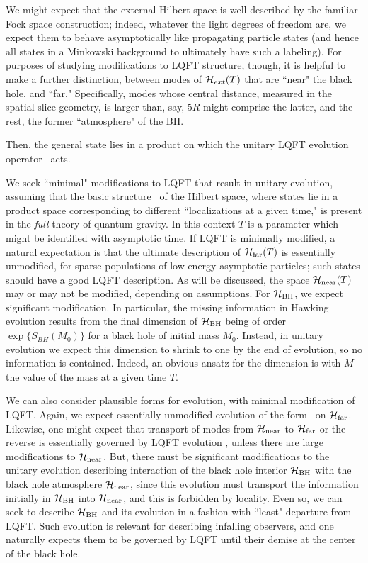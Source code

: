 We might expect that the external Hilbert space is well-described by the familiar Fock space construction; indeed, whatever the light degrees of freedom are, we expect them to behave asymptotically like propagating particle states (and hence all states in a Minkowski background to ultimately have such a labeling).
For purposes of studying modifications to LQFT structure, though, it is helpful to make a further distinction, between modes of ${\cal H}_{ext}(T)$ that are ``near" the black hole, and ``far,"  
%
\eqn{}
%
Specifically, modes whose central distance, measured in the spatial slice geometry,  is larger than, say, $5R$ might comprise the latter, and the rest, the former ``atmosphere"  of the BH.

Then, the general state lies in a product
%
\eqn{} 
%
on which the unitary LQFT evolution operator \unitop\ acts.

We seek ``minimal" modifications to LQFT that result in unitary evolution, assuming that the basic structure \bnfdecomp\ of the Hilbert space, where states lie in a product space corresponding to different ``localizations at a given time," is present in the {\it full} theory of quantum gravity.  In this context $T$ is a parameter which might be identified with asymptotic time.  If LQFT is minimally modified, a natural expectation is that the ultimate description of ${{\cal H}_{\rm far}}(T)$ is essentially unmodified, for sparse populations of low-energy asymptotic particles; such states should have a good LQFT description.  As will be discussed, the space ${{\cal H}_{\rm near}}(T)$ may or may not be modified, depending on assumptions.  For ${{\cal H}_{\rm BH}}$, we expect significant modification.  In particular, the missing information in Hawking evolution results from the final dimension of ${{\cal H}_{\rm BH}}$ being of order $\exp\{S_{BH}(M_0)\}$ for a black hole of initial mass $M_0$.   Instead, in unitary evolution we expect this dimension to shrink to one by the end of evolution, so no information is contained.  Indeed, an obvious ansatz for the dimension is 
%
\eqn{}
%
with $M$ the value of the mass at a given time $T$.


We can also consider plausible forms for evolution, with minimal modification of LQFT.  Again, we expect essentially unmodified evolution of the form \unitop\ on ${{\cal H}_{\rm far}}$.  Likewise, one might expect that transport of modes from ${{\cal H}_{\rm near}}$ to ${{\cal H}_{\rm far}}$ or the reverse is essentially governed by LQFT evolution \unitop, unless there are large modifications to ${{\cal H}_{\rm near}}$.  But, there must be significant modifications to the unitary evolution describing interaction of the black hole interior ${{\cal H}_{\rm BH}}$ with the black hole atmosphere ${{\cal H}_{\rm near}}$, since this evolution must transport the information initially in ${{\cal H}_{\rm BH}}$ into ${{\cal H}_{\rm near}}$, and this is forbidden by locality.   Even so, we can seek to describe ${{\cal H}_{\rm BH}}$ and its evolution in a fashion with ``least" departure from LQFT.  Such evolution is relevant for describing infalling observers, and one naturally expects them to be governed by LQFT until their demise at the center of the black hole.

